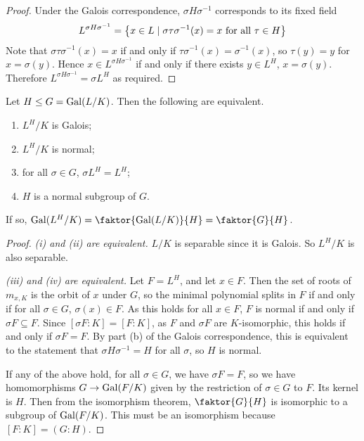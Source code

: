 \begin{proof}
	Under the Galois correspondence, \( \sigma H \sigma^{-1} \) corresponds to its fixed field
	\[ L^{\sigma H \sigma^{-1}} = \qty{x \in L \mid \sigma \tau \sigma^{-1}(x) = x \text{ for all } \tau \in H} \]
	Note that \( \sigma \tau \sigma^{-1}(x) = x \) if and only if \( \tau \sigma^{-1}(x) = \sigma^{-1}(x) \), so \( \tau(y) = y \) for \( x = \sigma(y) \).
	Hence \( x \in L^{\sigma H \sigma^{-1}} \) if and only if there exists \( y \in L^H \), \( x = \sigma(y) \).
	Therefore \( L^{\sigma H \sigma^{-1}} = \sigma L^H \) as required.
\end{proof}
\begin{theorem}
	Let \( H \leq G = \operatorname{Gal}(L/K) \).
	Then the following are equivalent.
	\begin{enumerate}
		\item \( L^H / K \) is Galois;
		\item \( L^H / K \) is normal;
		\item for all \( \sigma \in G \), \( \sigma L^H = L^H \);
		\item \( H \) is a normal subgroup of \( G \).
	\end{enumerate}
	If so, \( \Gal(L^H / K) = \faktor{\Gal(L / K)}{H} = \faktor{G}{H} \).
\end{theorem}
\begin{proof}
	\emph{(i) and (ii) are equivalent.}
	\( L / K \) is separable since it is Galois.
	So \( L^H / K \) is also separable.

	\emph{(iii) and (iv) are equivalent.}
	Let \( F = L^H \), and let \( x \in F \).
	Then the set of roots of \( m_{x,K} \) is the orbit of \( x \) under \( G \), so the minimal polynomial splits in \( F \) if and only if for all \( \sigma \in G \), \( \sigma(x) \in F \).
	As this holds for all \( x \in F \), \( F \) is normal if and only if \( \sigma F \subseteq F \).
	Since \( [\sigma F : K] = [F : K] \), as \( F \) and \( \sigma F \) are \( K \)-isomorphic, this holds if and only if \( \sigma F = F \).
	By part (b) of the Galois correspondence, this is equivalent to the statement that \( \sigma H \sigma^{-1} = H \) for all \( \sigma \), so \( H \) is normal.

	If any of the above hold, for all \( \sigma \in G \), we have \( \sigma F = F \), so we have homomorphisms \( G \to \operatorname{Gal}(F/K) \) given by the restriction of \( \sigma \in G \) to \( F \).
	Its kernel is \( H \).
	Then from the isomorphism theorem, \( \faktor{G}{H} \) is isomorphic to a subgroup of \( \operatorname{Gal}(F/K) \).
	This must be an isomorphism because \( [F : K] = (G : H) \).
\end{proof}
